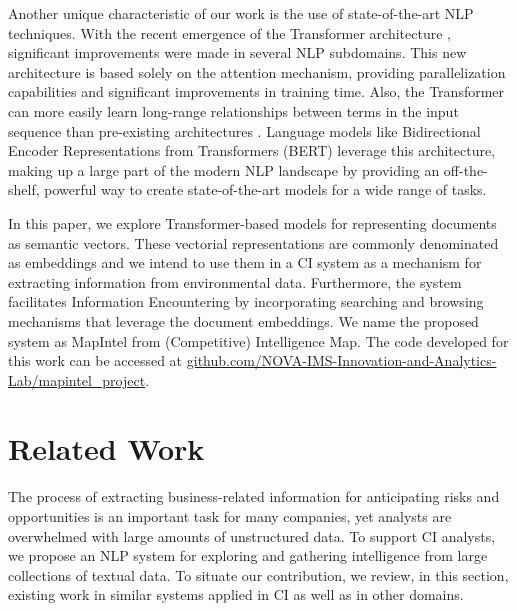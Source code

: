 \documentclass[a4paper]{article}
\begin{document}
Another unique characteristic of our work is the use of state-of-the-art NLP techniques. With the recent emergence of the Transformer architecture \citep{vaswani2017}, significant improvements were made in several NLP subdomains. This new architecture is based solely on the attention mechanism, providing parallelization capabilities and significant improvements in training time. Also, the Transformer can more easily learn long-range relationships between terms in the input sequence than pre-existing architectures \citep{vaswani2017}. Language models like Bidirectional Encoder Representations from Transformers (BERT) \citep{devlin2019} leverage this architecture, making up a large part of the modern NLP landscape by providing an off-the-shelf, powerful way to create state-of-the-art models for a wide range of tasks.

In this paper, we explore Transformer-based models for representing documents as semantic vectors. These vectorial representations are commonly denominated as embeddings and we intend to use them in a CI system as a mechanism for extracting information from environmental data. Furthermore, the system facilitates Information Encountering by incorporating searching and browsing mechanisms that leverage the document embeddings. We name the proposed system as MapIntel from (Competitive) Intelligence Map. The code developed for this work can be accessed at \href{https://github.com/NOVA-IMS-Innovation-and-Analytics-Lab/mapintel_project}{github.com/NOVA-IMS-Innovation-and-Analytics-Lab/mapintel\_project}.

\section{Related Work}
The process of extracting business-related information for anticipating risks and opportunities is an important task for many companies, yet analysts are overwhelmed with large amounts of unstructured data. To support CI analysts, we propose an NLP system for exploring and gathering intelligence from large collections of textual data. To situate our contribution, we review, in this section, existing work in similar systems applied in CI as well as in other domains.
\end{document}

